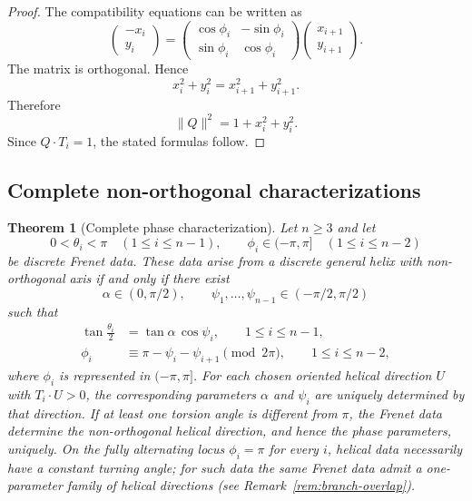 \documentclass[10pt,a4paper]{amsart}
\newtheorem{theorem}{Theorem}[section]
\theoremstyle{definition}
\theoremstyle{remark}
\numberwithin{equation}{section}
\begin{document}
\begin{proof}
The compatibility equations can be written as
\[
\begin{pmatrix}-x_i\\ y_i\end{pmatrix}
=
\begin{pmatrix}
\cos\phi_i&-\sin\phi_i\\
\sin\phi_i&\cos\phi_i
\end{pmatrix}
\begin{pmatrix}x_{i+1}\\ y_{i+1}\end{pmatrix}.
\]
The matrix is orthogonal. Hence
\[
x_i^2+y_i^2=x_{i+1}^2+y_{i+1}^2.
\]
Therefore
\[
\|Q\|^2=1+x_i^2+y_i^2.
\]
Since \(Q\cdot T_i=1\), the stated formulas follow.
\end{proof}

\subsection{Complete non-orthogonal characterizations}

\begin{theorem}[Complete phase characterization]\label{thm:phase-parametrization}
Let $n\ge3$ and let
\[
0<\theta_i<\pi\quad(1\le i\le n-1),\qquad
\phi_i\in(-\pi,\pi]\quad(1\le i\le n-2)
\]
be discrete Frenet data. These data arise from a discrete general helix with non-orthogonal axis if and only if there exist
\[
\alpha\in(0,\pi/2),\qquad
\psi_1,\ldots,\psi_{n-1}\in(-\pi/2,\pi/2)
\]
such that
\begin{align}
\tan\frac{\theta_i}{2}&=\tan\alpha\,\cos\psi_i,
\qquad 1\le i\le n-1,\label{eq:phase-theta}\\
\phi_i&\equiv \pi-\psi_i-\psi_{i+1}\pmod{2\pi},
\qquad 1\le i\le n-2,\label{eq:phase-phi}
\end{align}
where $\phi_i$ is represented in $(-\pi,\pi]$. For each chosen oriented helical direction $U$ with $T_i\cdot U>0$, the corresponding parameters $\alpha$ and $\psi_i$ are uniquely determined by that direction. If at least one torsion angle is different from $\pi$, the Frenet data determine the non-orthogonal helical direction, and hence the phase parameters, uniquely. On the fully alternating locus $\phi_i=\pi$ for every $i$, helical data necessarily have a constant turning angle; for such data the same Frenet data admit a one-parameter family of helical directions (see Remark~\ref{rem:branch-overlap}).
\end{theorem}
\end{document}
